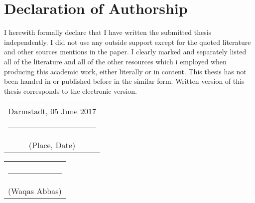 \chapter*{Declaration of Authorship}

I herewith formally declare that I have written the submitted thesis independently. I did not use any outside support except for the quoted literature and other sources mentions in the paper. I clearly marked and separately listed all of the literature and all of the other resources which i employed when producing this academic work, either literally or in content. This thesis has not been handed in or published before in the similar form. Written version of this thesis corresponds to the electronic version.

\vspace*{3cm}
\noindent
\begin{tabular}{c} Darmstadt, 05 June 2017\\\rule{5cm}{1pt} \\ (Place, Date)\end{tabular}  \hfill \begin{tabular}{c} \\ \\ \rule{5cm}{1pt} \\ (Waqas Abbas)\end{tabular}